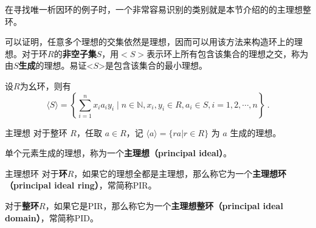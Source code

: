 

在寻找唯一析因环的例子时，一个非常容易识别的类别就是本节介绍的的主理想整环。

可以证明，任意多个理想的交集依然是理想，因而可以用该方法来构造环上的理想。对于环$R$的\textbf{非空子集}$S$，用$<S>$表示环上所有包含该集合的理想之交，称为由$S$\textbf{生成}的理想。易证<$S$>是包含该集合的最小理想。
\begin{example}{}
设$R$为幺环，则有
\begin{equation}
\langle S\rangle=\left\{\sum_{i=1}^n x_i a_iy_i \mid n \in \mathbb{N}, x_i,y_i \in R, a_i \in S, i=1,2, \cdots, n\right\}~.
\end{equation}
\end{example}
\begin{definition}{主理想}
对于整环 $R$，任取 $a\in R$，记 $\langle a \rangle=\{ra|r\in R\}$ 为 $a$ 生成的理想。

单个元素生成的理想，称为一个\textbf{主理想（principal ideal）}。
\end{definition}

\begin{definition}{主理想环}
对于\textbf{环}$R$，如果它的理想全都是主理想，那么称它为一个\textbf{主理想环（principal ideal ring）}，常简称PIR。

对于\textbf{整环}$R$，如果它是PIR，那么称它为一个\textbf{主理想整环（principal ideal domain）}，常简称PID。
\end{definition}







